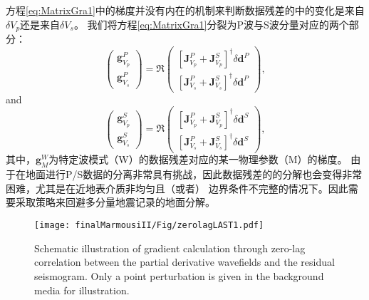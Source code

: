 方程\eqref{eq:MatrixGra1}中的梯度并没有内在的机制来判断数据残差的中的变化是来自$\delta V_p$还是来自$\delta V_s$。
我们将方程\eqref{eq:MatrixGra1}分裂为P波与S波分量对应的两个部分：
\begin{equation}
        \begin{pmatrix}
                \mathbf{g}^P_{V_p}\\
                \mathbf{g}^P_{V_s}
        \end{pmatrix}
        =\mathfrak{R}\begin{pmatrix}
                [\mathbf{J}^P_{V_p}+\mathbf{J}^S_{V_p}]^{\dagger}\delta \mathbf{d}^P\\
                [\mathbf{J}^P_{V_s}+\mathbf{J}^S_{V_s}]^{\dagger}\delta \mathbf{d}^P
        \end{pmatrix},
        \label{eq:DEMatrixGraP}
\end{equation}
and
\begin{equation}
        \begin{pmatrix}
                \mathbf{g}^S_{V_p}\\
                \mathbf{g}^S_{V_s}
        \end{pmatrix}
        =\mathfrak{R}\begin{pmatrix}
                [\mathbf{J}^P_{V_p}+\mathbf{J}^S_{V_p}]^{\dagger}\delta \mathbf{d}^S\\
                [\mathbf{J}^P_{V_s}+\mathbf{J}^S_{V_s}]^{\dagger}\delta \mathbf{d}^S
        \end{pmatrix},
        \label{eq:DEMatrixGraS}
\end{equation}
其中，$\mathbf{g}^W_M$为特定波模式（W）的数据残差对应的某一物理参数（M）的梯度。
由于在地面进行P/S数据的分离非常具有挑战，因此数据残差的的分解也会变得非常困难，尤其是在近地表介质非均匀且（或者）
边界条件不完整的情况下。因此需要采取策略来回避多分量地震记录的地面分解。
\begin{figure*}
    \begin{center}
        \texttt{[image: finalMarmousiII/Fig/zerolagLAST1.pdf]}
        \caption{
Schematic illustration of gradient calculation through zero-lag correlation
 between the partial derivative wavefields
and the residual seismogram.
Only a point perturbation is given in the background media for illustration.
    }
    \label{fig:crossterm}
    \end{center}
\end{figure*}

